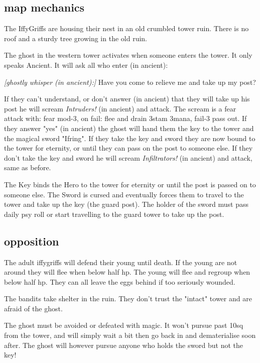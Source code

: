 \subsection*{map mechanics}

The IffyGriffs are housing their nest in an old crumbled tower ruin. There is no roof and a sturdy tree growing in the old ruin.

The ghost in the western tower activates when someone enters the tower. It only speaks Ancient. It will ask all who enter (in ancient):
\begin{readoutloud}
\emph{[ghostly whisper (in ancient):]}
Have you come to relieve me and take up my post?
\end{readoutloud}
\noindent If they can't understand, or don't answer (in ancient) that they will take up his post he will scream \emph{Intruders!} (in ancient) and attack. The scream is a fear attack with: fear mod-3, on fail: flee and drain 3stam 3mana, fail-3 pass out.
If they answer "yes" (in ancient) the ghost will hand them the key to the tower and the magical sword "Ifring". If they take the key and sword they are now bound to the tower for eternity, or until they can pass on the post to someone else. If they don't take the key and sword he will scream \emph{Infiltrators!} (in ancient) and attack, same as before.

The Key binds the Hero to the tower for eternity or until the post is passed on to someone else. The Sword is cursed and eventually forces them to travel to the tower and take up the key (the guard post). The holder of the sword must pass daily psy roll or start travelling to the guard tower to take up the post.


\subsection*{opposition}

The adult iffygriffs will defend their young until death. If the young are not around they will flee when below half hp. The young will flee and regroup when below half hp. They can all leave the eggs behind if too seriously wounded.

The bandits take shelter in the ruin. They don't trust the "intact" tower and are afraid of the ghost.

The ghost must be avoided or defeated with magic. It won't pursue past 10sq from the tower, and will simply wait a bit then go back in and dematerialise soon after. The ghost will however pursue anyone who holds the sword but not the key!


